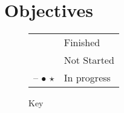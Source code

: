 \section{Objectives}

\begin{figure}[h!]
	\caption*{Key}
	\begin{center}
		\begin{tabular}{rl}
		\Checkmark & Finished\\
		\XSolidBrush & Not Started\\
		– $\bullet$ $\star$ & In progress\\
		\end{tabular}
	\end{center}
\end{figure}

\label{Objectives}
